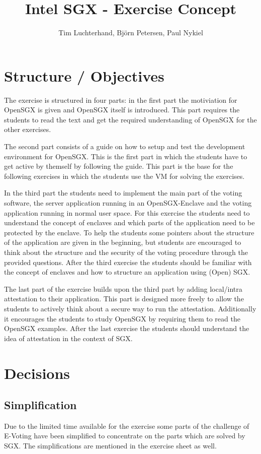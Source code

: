 \documentclass[DIN, pagenumber=false, fontsize=11pt, parskip=half]{scrartcl}
\title{Intel SGX - Exercise Concept}
\author{Tim Luchterhand, Björn Petersen, Paul Nykiel}
\begin{document}
    \maketitle
    \section{Structure / Objectives}
    The exercise is structured in four parts: in the first part the motiviation for OpenSGX is given and OpenSGX
    itself is introduced. This part requires the students to read the text and get the required understanding of
    OpenSGX for the other exercises.

    The second part consists of a guide on how to setup and test the development environment for OpenSGX. This is the
    first part in which the students have to get active by themself by following the guide. This part is the base
    for the following exercises in which the students use the VM for solving the exercises.

    In the third part the students need to implement the main part of the voting software, the server
    application running in an OpenSGX-Enclave and the voting application running in normal user space.
    For this exercise the students need to understand the concept of enclaves and which parts of the application
    need to be protected by the enclave. To help the students some pointers about the structure of the application
    are given in the beginning, but students are encouraged to think about the structure and the security of the
    voting procedure through the provided questions. After the third exercise the students should be familiar with
    the concept of enclaves and how to structure an application using (Open) SGX.

    The last part of the exercise builds upon the third part by adding local/intra attestation to their application.
    This part is designed more freely to allow the students to actively think about a secure way to run the attestation.
    Additionally it encourages the students to study OpenSGX by requiring them to read the OpenSGX examples.
    After the last exercise the students should understand the idea of attestation in the context of SGX.
    
    \section{Decisions}
    \subsection{Simplification}
    Due to the limited time available for the exercise some parts of the challenge of
    E-Voting have been simplified to concentrate on the parts which are solved by SGX.
    The simplifications are mentioned in the exercise sheet as well.
\end{document}
